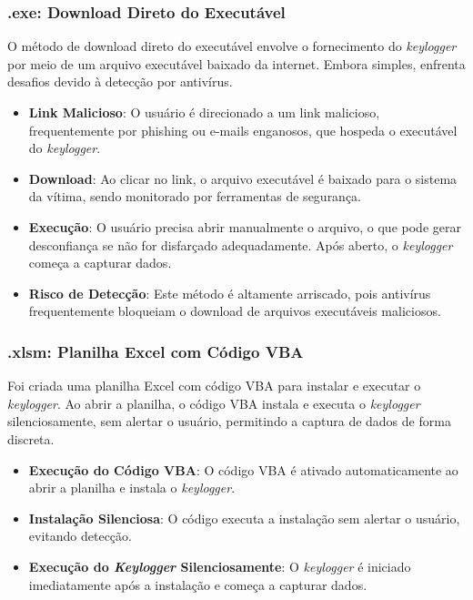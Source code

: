\documentclass[12pt]{article}
\begin{document}
\subsubsection{.exe: Download Direto do Executável}

O método de download direto do executável envolve o fornecimento do \textit{keylogger} por meio de um arquivo executável baixado da internet. Embora simples, enfrenta desafios devido à detecção por antivírus.

\begin{itemize}
    \item \textbf{Link Malicioso}: O usuário é direcionado a um link malicioso, frequentemente por phishing ou e-mails enganosos, que hospeda o executável do \textit{keylogger}.
    \item \textbf{Download}: Ao clicar no link, o arquivo executável é baixado para o sistema da vítima, sendo monitorado por ferramentas de segurança.
    \item \textbf{Execução}: O usuário precisa abrir manualmente o arquivo, o que pode gerar desconfiança se não for disfarçado adequadamente. Após aberto, o \textit{keylogger} começa a capturar dados.
    \item \textbf{Risco de Detecção}: Este método é altamente arriscado, pois antivírus frequentemente bloqueiam o download de arquivos executáveis maliciosos.
\end{itemize}

\subsubsection{.xlsm: Planilha Excel com Código VBA}

Foi criada uma planilha Excel com código VBA para instalar e executar o \textit{keylogger}. Ao abrir a planilha, o código VBA instala e executa o \textit{keylogger} silenciosamente, sem alertar o usuário, permitindo a captura de dados de forma discreta.

\begin{itemize}
    \item \textbf{Execução do Código VBA}: O código VBA é ativado automaticamente ao abrir a planilha e instala o \textit{keylogger}.
    \item \textbf{Instalação Silenciosa}: O código executa a instalação sem alertar o usuário, evitando detecção.
    \item \textbf{Execução do \textit{Keylogger} Silenciosamente}: O \textit{keylogger} é iniciado imediatamente após a instalação e começa a capturar dados.
\end{itemize}
\end{document}

